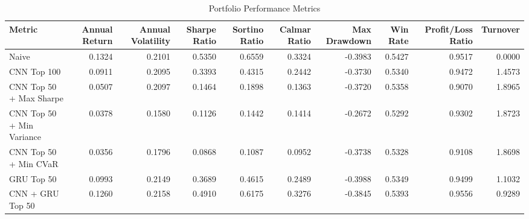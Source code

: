 \begin{table}[htbp]
\centering
\caption{Portfolio Performance Metrics}
\begin{tabular}{lrrrrrrrrr}
\hline
Metric & Annual Return & Annual Volatility & Sharpe Ratio & Sortino Ratio & Calmar Ratio & Max Drawdown & Win Rate & Profit/Loss Ratio & Turnover \\
\hline
Naive & 0.1324 & 0.2101 & 0.5350 & 0.6559 & 0.3324 & -0.3983 & 0.5427 & 0.9517 & 0.0000 \\
CNN Top 100 & 0.0911 & 0.2095 & 0.3393 & 0.4315 & 0.2442 & -0.3730 & 0.5340 & 0.9472 & 1.4573 \\
CNN Top 50 + Max Sharpe & 0.0507 & 0.2097 & 0.1464 & 0.1898 & 0.1363 & -0.3720 & 0.5358 & 0.9070 & 1.8965 \\
CNN Top 50 + Min Variance & 0.0378 & 0.1580 & 0.1126 & 0.1442 & 0.1414 & -0.2672 & 0.5292 & 0.9302 & 1.8723 \\
CNN Top 50 + Min CVaR & 0.0356 & 0.1796 & 0.0868 & 0.1087 & 0.0952 & -0.3738 & 0.5328 & 0.9108 & 1.8698 \\
GRU Top 50 & 0.0993 & 0.2149 & 0.3689 & 0.4615 & 0.2489 & -0.3988 & 0.5349 & 0.9499 & 1.1032 \\
CNN + GRU Top 50 & 0.1260 & 0.2158 & 0.4910 & 0.6175 & 0.3276 & -0.3845 & 0.5393 & 0.9556 & 0.9289 \\
\hline
\end{tabular}
\end{table}